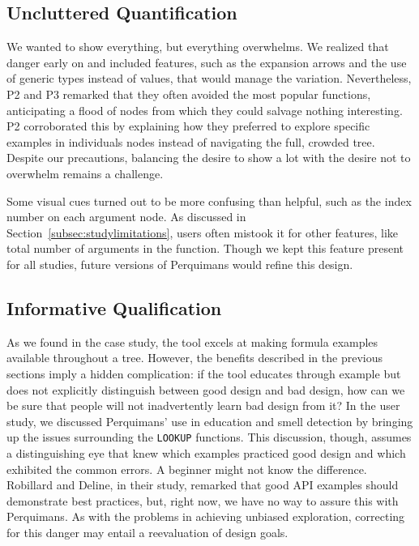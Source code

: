 \documentclass[conference]{IEEEtran}
\newcommand{\toolname}{Perquimans\xspace} \newcommand{\toolnameend}{Perquimans}
\newcommand{\toolnameposs}{Perquimans' }
\begin{document}
	\subsection{Uncluttered Quantification}
	
	We wanted to show everything, but everything overwhelms. We realized that danger
	early on and included features, such as the expansion arrows and the use of generic types
	instead of values, that would manage the variation. Nevertheless, P2 and P3 remarked
	that they often avoided the most popular functions, anticipating a flood
	of nodes from which they could salvage nothing interesting. P2 corroborated
	this by explaining how they preferred to explore specific examples in
	individuals nodes instead of navigating the full, crowded tree. Despite our
	precautions, balancing the desire to show a lot with the desire not to
	overwhelm remains a challenge.
	
	Some visual cues turned out to be more confusing than helpful, such as
	the index number on each argument node. As discussed in Section~\ref{subsec:studylimitations},
	users often mistook it for other features, like total number of arguments in the
	function. Though we kept this feature present for all studies, future versions
	of \toolname would refine this design. 
	
	\subsection{Informative Qualification}
	
	As we found in the case study, the tool excels at making formula examples
	available throughout a tree. However, the benefits described in the previous
	sections imply a hidden complication: if the tool educates through example but
	does not explicitly distinguish between good design and bad design, how can we
	be sure that people will not inadvertently learn bad design from it? In the
	user study, we discussed \toolnameposs use in education and smell detection by bringing
	up the issues surrounding the \texttt{LOOKUP} functions. This discussion, though,
	assumes a distinguishing eye that knew which examples practiced good design
	and which exhibited the common errors. A beginner might not know the
	difference. Robillard and Deline, in their study, remarked that good API
	examples should demonstrate best practices, but, right now, we have no way to
	assure this with \toolnameend. As with the problems in achieving unbiased
	exploration, correcting for this danger may entail a reevaluation of design
	goals.
	
\end{document}
